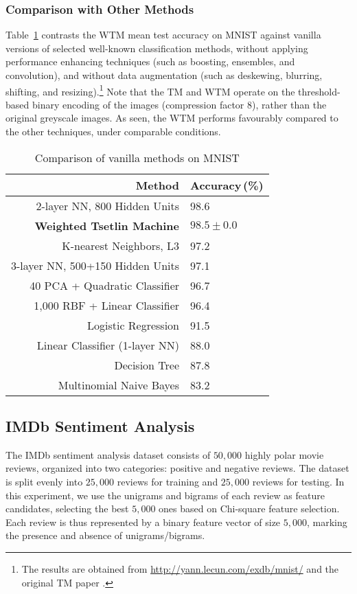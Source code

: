 \documentclass[letterpaper]{article}
\begin{document}
\subsubsection{Comparison with Other Methods}
Table~\ref{tab:comp} contrasts the WTM mean test accuracy on MNIST against vanilla versions of selected well-known classification methods, without applying performance enhancing techniques (such as boosting, ensembles, and convolution), and without data augmentation (such as deskewing, blurring, shifting, and resizing).\footnote{The results are obtained from \url{http://yann.lecun.com/exdb/mnist/} 
and the original TM paper \cite{granmo2018tsetlin}.} Note that the TM and WTM operate on the threshold-based binary encoding of the images (compression factor 8), rather than the original greyscale images. As seen, the WTM performs favourably compared to the other techniques, under comparable conditions.



\begin{table}[!ht]
\centering
\begin{tabular}{rl}
\toprule
\bfseries Method&\bfseries Accuracy\,(\%)\!\!\!\\
\midrule[\heavyrulewidth]
2-layer NN, 800 Hidden Units&98.6\\
\bfseries Weighted Tsetlin Machine&\boldmath$98.5\pm0.0$\\
K-nearest Neighbors, L3&97.2\\
3-layer NN, 500+150 Hidden Units&97.1\\
40 PCA + Quadratic Classifier&96.7\\
1,000 RBF + Linear Classifier&96.4\\
Logistic Regression&91.5\\
Linear Classifier (1-layer NN)&88.0\\
Decision Tree&87.8\\
Multinomial Naive Bayes&83.2\\
\bottomrule
\end{tabular}
\caption{Comparison of vanilla methods on MNIST}
\label{tab:comp}
\end{table}

\subsection{IMDb Sentiment Analysis}
The IMDb sentiment analysis dataset consists of $50{,}000$ highly polar movie reviews, organized into two categories: positive and negative reviews. The dataset is split evenly into $25{,}000$ reviews for training and $25{,}000$ reviews for testing. In this experiment, we use the unigrams and bigrams of each review as feature candidates, selecting the best $5{,}000$ ones based on Chi-square feature selection. Each review is thus represented by a binary feature vector of size $5{,}000$, marking the presence and absence of unigrams/bigrams.
\end{document}
